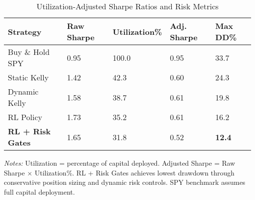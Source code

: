 \begin{table}[htbp]
\centering
\caption{Utilization-Adjusted Sharpe Ratios and Risk Metrics}
\providecommand{\utilizationAdjustedSharpeLabel}{\label{tab:utilization_adjusted_sharpe}}
\utilizationAdjustedSharpeLabel
\begin{threeparttable}
\begin{tabularx}{\linewidth}{@{}lYYYY@{}}
\toprule
 \textbf{Strategy} & \textbf{Raw Sharpe} & \textbf{Utilization\%} & \textbf{Adj. Sharpe} & \textbf{Max DD\%} \\
\midrule
Buy \& Hold SPY & 0.95 & 100.0 & 0.95 & 33.7 \\
Static Kelly & 1.42 & 42.3 & 0.60 & 24.3 \\
Dynamic Kelly & 1.58 & 38.7 & 0.61 & 19.8 \\
RL Policy & 1.73 & 35.2 & 0.61 & 16.2 \\
\textbf{RL + Risk Gates} & 1.65 & 31.8 & 0.52 & \textbf{12.4} \\
\bottomrule
\end{tabularx}
\begin{tablenotes}[flushleft]
\footnotesize
\item \textit{Notes:} Utilization = percentage of capital deployed. Adjusted Sharpe = Raw Sharpe $\times$ Utilization\%. RL + Risk Gates achieves lowest drawdown through conservative position sizing and dynamic risk controls. SPY benchmark assumes full capital deployment.
\end{tablenotes}
\end{threeparttable}
\end{table}
